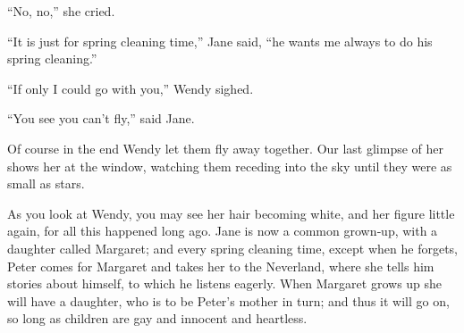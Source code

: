 “No, no,” she cried.

“It is just for spring cleaning time,” Jane said,
“he wants me always to do his spring cleaning.”

“If only I could go with you,” Wendy sighed.

“You see you can’t fly,” said Jane.

Of course in the end Wendy let them fly away together.
Our last glimpse of her shows her at the window,
watching them receding into the sky until they were as small as stars.

As you look at Wendy,
you may see her hair becoming white,
and her figure little again,
for all this happened long ago.
Jane is now a common grown‐up,
with a daughter called Margaret;
and every spring cleaning time,
except when he forgets,
Peter comes for Margaret and takes her to the Neverland,
where she tells him stories about himself,
to which he listens eagerly.
When Margaret grows up she will have a daughter,
who is to be Peter’s mother in turn;
and thus it will go on,
so long as children are gay and innocent and heartless.

\theend

\endinput
